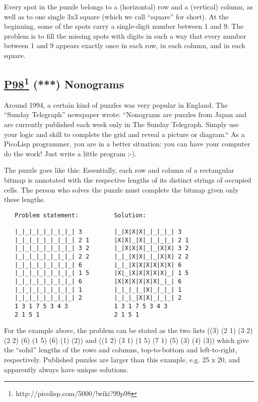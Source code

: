 \documentclass[10pt,a4paper]{article}
\begin{document}
Every spot in the puzzle belongs to a (horizontal) row and a (vertical)
column, as well as to one single 3x3 square (which we call ``square''
for short). At the beginning, some of the spots carry a single-digit
number between 1 and 9. The problem is to fill the missing spots with
digits in such a way that every number between 1 and 9 appears exactly
once in each row, in each column, and in each square.

\subsection*{\underline{P98}\footnote{http://picolisp.com/5000/!wiki?99p98} (***) Nonograms}
Around 1994, a certain kind of puzzles was very popular in England.
The ``Sunday Telegraph'' newspaper wrote: ``Nonograms are puzzles from
Japan and are currently published each week only in The Sunday
Telegraph.  Simply use your logic and skill to complete the grid
and reveal a picture or diagram.`` As a PicoLisp programmer, you are in
a better situation: you can have your computer do the work! Just write
a little program ;-).

The puzzle goes like this: Essentially, each row and column of a
rectangular bitmap is annotated with the respective lengths of
its distinct strings of occupied cells. The person who solves the puzzle
must complete the bitmap given only these lengths.
\begin{verbatim}
   Problem statement:          Solution:

   |_|_|_|_|_|_|_|_| 3         |_|X|X|X|_|_|_|_| 3
   |_|_|_|_|_|_|_|_| 2 1       |X|X|_|X|_|_|_|_| 2 1
   |_|_|_|_|_|_|_|_| 3 2       |_|X|X|X|_|_|X|X| 3 2
   |_|_|_|_|_|_|_|_| 2 2       |_|_|X|X|_|_|X|X| 2 2
   |_|_|_|_|_|_|_|_| 6         |_|_|X|X|X|X|X|X| 6
   |_|_|_|_|_|_|_|_| 1 5       |X|_|X|X|X|X|X|_| 1 5
   |_|_|_|_|_|_|_|_| 6         |X|X|X|X|X|X|_|_| 6
   |_|_|_|_|_|_|_|_| 1         |_|_|_|_|X|_|_|_| 1
   |_|_|_|_|_|_|_|_| 2         |_|_|_|X|X|_|_|_| 2
   1 3 1 7 5 3 4 3             1 3 1 7 5 3 4 3
   2 1 5 1                     2 1 5 1
\end{verbatim}

For the example above, the problem can be stated as the two lists
((3) (2 1) (3 2) (2 2) (6) (1 5) (6) (1) (2)) and
((1 2) (3 1) (1 5) (7 1) (5) (3) (4) (3))
which give the ``solid'' lengths of the rows and columns, top-to-bottom and
left-to-right, respectively. Published puzzles are larger than this
example, e.g. 25 x 20, and apparently always have unique solutions.
\end{document}
